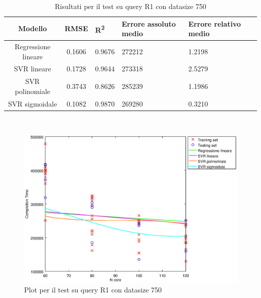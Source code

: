 \documentclass[a4paper,11pt]{article}
\begin{document}
\begin{table}[bhpt]
	\centering
	\begin{adjustbox}{center}
		\begin{tabular}{c | c M{1.2cm} M{2.5cm} M{2.5cm} M{1.8cm}}
			Modello & RMSE & R\textsuperscript{2} & Errore assoluto medio & Errore relativo medio \tabularnewline
			\hline
			Regressione lineare & 0.1606 & 0.9676 & 272212 & 1.2198 \\
			SVR lineare & 0.1728 & 0.9644 & 273318 & 2.5279 \\
			SVR polinomiale & 0.3743 & 0.8626 & 285239 & 1.1986 \\
			SVR sigmoidale & 0.1082 & 0.9870 & 269280 & 0.3210 \\
		\end{tabular}
	\end{adjustbox}
	\\
	\caption{Risultati per il test su query R1 con datasize 750}
	\label{table_R1_750}
\end{table}

\begin {figure}[hbtp]
\centering
\includegraphics[width=\textwidth]{output/R1_750/plot_R1_750.eps}
\caption {Plot per il test su query R1 con datasize 750}
\end {figure}

\newpage
\newpage
\end{document}
